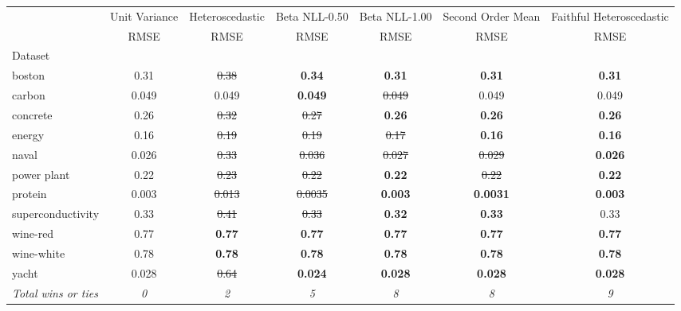 \begin{tabular}{l|c|c|c|c|c|c}
\toprule
{} & {Unit Variance} & {Heteroscedastic} & {Beta NLL-0.50} & {Beta NLL-1.00} & {Second Order Mean} & {Faithful Heteroscedastic} \\
{} & {RMSE} & {RMSE} & {RMSE} & {RMSE} & {RMSE} & {RMSE} \\
{Dataset} & {} & {} & {} & {} & {} & {} \\
\midrule
boston & 0.31 & \sout{0.38} & \textbf{0.34} & \textbf{0.31} & \textbf{0.31} & \textbf{0.31} \\
carbon & 0.049 & 0.049 & \textbf{0.049} & \sout{0.049} & 0.049 & 0.049 \\
concrete & 0.26 & \sout{0.32} & \sout{0.27} & \textbf{0.26} & \textbf{0.26} & \textbf{0.26} \\
energy & 0.16 & \sout{0.19} & \sout{0.19} & \sout{0.17} & \textbf{0.16} & \textbf{0.16} \\
naval & 0.026 & \sout{0.33} & \sout{0.036} & \sout{0.027} & \sout{0.029} & \textbf{0.026} \\
power plant & 0.22 & \sout{0.23} & \sout{0.22} & \textbf{0.22} & \sout{0.22} & \textbf{0.22} \\
protein & 0.003 & \sout{0.013} & \sout{0.0035} & \textbf{0.003} & \textbf{0.0031} & \textbf{0.003} \\
superconductivity & 0.33 & \sout{0.41} & \sout{0.33} & \textbf{0.32} & \textbf{0.33} & 0.33 \\
wine-red & 0.77 & \textbf{0.77} & \textbf{0.77} & \textbf{0.77} & \textbf{0.77} & \textbf{0.77} \\
wine-white & 0.78 & \textbf{0.78} & \textbf{0.78} & \textbf{0.78} & \textbf{0.78} & \textbf{0.78} \\
yacht & 0.028 & \sout{0.64} & \textbf{0.024} & \textbf{0.028} & \textbf{0.028} & \textbf{0.028} \\
\textit{{Total wins or ties}} & \textit{0} & \textit{2} & \textit{5} & \textit{8} & \textit{8} & \textit{9} \\
\bottomrule
\end{tabular}

